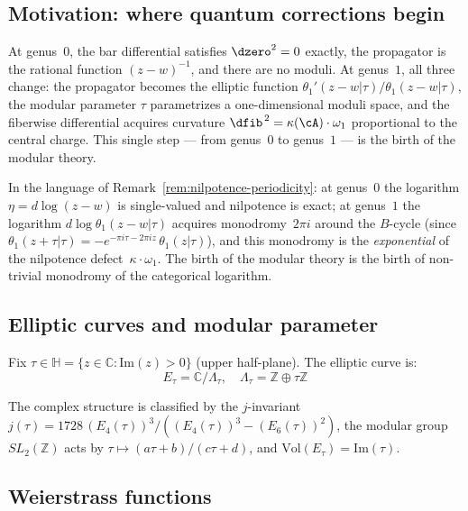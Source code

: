 \subsection{Motivation: where quantum corrections begin}

At genus~$0$, the bar differential satisfies $\dzero^2 = 0$ exactly,
the propagator is the rational function $(z - w)^{-1}$, and there
are no moduli.  At genus~$1$, all three change: the propagator
becomes the elliptic function $\theta_1'(z-w|\tau)/\theta_1(z-w|\tau)$,
the modular parameter $\tau$ parametrizes a one-dimensional moduli
space, and the fiberwise differential acquires curvature $\dfib^{\,2} = \kappa(\cA)\cdot\omega_1$ proportional to the central
charge.  This single step --- from genus~$0$ to genus~$1$ --- is
the birth of the modular theory.

In the language of Remark~\ref{rem:nilpotence-periodicity}: at
genus~$0$ the logarithm $\eta = d\log(z-w)$ is single-valued and
nilpotence is exact; at genus~$1$ the logarithm
$d\log\theta_1(z-w|\tau)$ acquires monodromy~$2\pi i$ around the
$B$-cycle (since
$\theta_1(z + \tau|\tau) = -e^{-\pi i\tau - 2\pi i z}\,
\theta_1(z|\tau)$), and this monodromy is the \emph{exponential} of
the nilpotence defect~$\kappa\cdot\omega_1$.  The birth of the
modular theory is the birth of non-trivial monodromy of the
categorical logarithm.

\subsection{Elliptic curves and modular parameter}

\begin{definition}
\label{def:elliptic-curve-tau}
Fix $\tau \in \mathbb{H} = \{z \in \mathbb{C} : \text{Im}(z) > 0\}$ (upper half-plane).
The elliptic curve is:
\begin{equation}
E_\tau = \mathbb{C} / \Lambda_\tau, \quad \Lambda_\tau = \mathbb{Z} \oplus \tau\mathbb{Z}
\end{equation}

The complex structure is classified by the $j$-invariant $j(\tau) = 1728\,(E_4(\tau))^3/((E_4(\tau))^3 - (E_6(\tau))^2)$, the modular group $SL_2(\mathbb{Z})$ acts by $\tau \mapsto (a\tau + b)/(c\tau + d)$, and $\text{Vol}(E_\tau) = \text{Im}(\tau)$.
\end{definition}

\subsection{Weierstrass functions}

